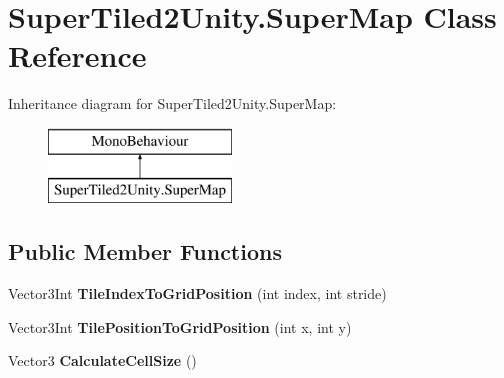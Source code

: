 \hypertarget{class_super_tiled2_unity_1_1_super_map}{}\section{Super\+Tiled2\+Unity.\+Super\+Map Class Reference}
\label{class_super_tiled2_unity_1_1_super_map}
Inheritance diagram for Super\+Tiled2\+Unity.\+Super\+Map\+:\begin{figure}[H]
\begin{center}
\leavevmode
\includegraphics[height=2.000000cm]{class_super_tiled2_unity_1_1_super_map}
\end{center}
\end{figure}
\subsection*{Public Member Functions}
\begin{DoxyCompactItemize}
\item 
\mbox{\label{class_super_tiled2_unity_1_1_super_map_ab4ce3773771decea2f4d25b0573acc40}} 
Vector3\+Int {\bfseries Tile\+Index\+To\+Grid\+Position} (int index, int stride)
\item 
\mbox{\label{class_super_tiled2_unity_1_1_super_map_a2bc9ea0d1f8c431a41ef8c586e97a40b}} 
Vector3\+Int {\bfseries Tile\+Position\+To\+Grid\+Position} (int x, int y)
\item 
\mbox{\label{class_super_tiled2_unity_1_1_super_map_aa96b46f198f0941e50ba61d23ec8756f}} 
Vector3 {\bfseries Calculate\+Cell\+Size} ()
\end{DoxyCompactItemize}
